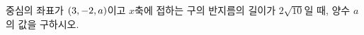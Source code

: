 중심의 좌표가 $(3{,}\mkern3mu\mathopen{}-2{,}\mkern3mu\mathopen{}a)$이고 $x$축에 접하는 구의 반지름의 길이가 $2\sqrt{10}$일 때, 양수 $a$의 값을 구하시오.
